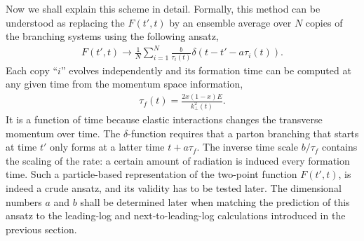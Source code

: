 Now we shall explain this scheme in detail.
Formally, this method can be understood as replacing the $F(t',t)$ by an ensemble average over $N$ copies of the branching systems using the following ansatz,
\begin{eqnarray}
F(t', t) \rightarrow \frac{1}{N}\sum_{i=1}^N \frac{b}{\tau_i(t)} \delta(t-t'- a \tau_i(t)).
\end{eqnarray}
Each copy ``$i$'' evolves independently and its formation time can be computed at any given time from the momentum space information,
\begin{eqnarray}
\tau_f(t) = \frac{2x(1-x) E}{k_\perp^2(t)}.
\end{eqnarray}
It is a function of time because elastic interactions changes the transverse momentum over time.
The $\delta$-function requires that a parton branching that starts at time $t'$  only forms at a latter time $t+a\tau_f$.
The inverse time scale $b/\tau_f$ contains the scaling of the rate: a certain amount of radiation is induced every formation time.
Such a particle-based representation of the two-point function $F(t', t)$, is indeed a crude ansatz, and its validity has to be tested later.
The dimensional numbers $a$ and $b$ shall be determined later when matching the prediction of this ansatz to the leading-log and next-to-leading-log calculations introduced in the previous section.

